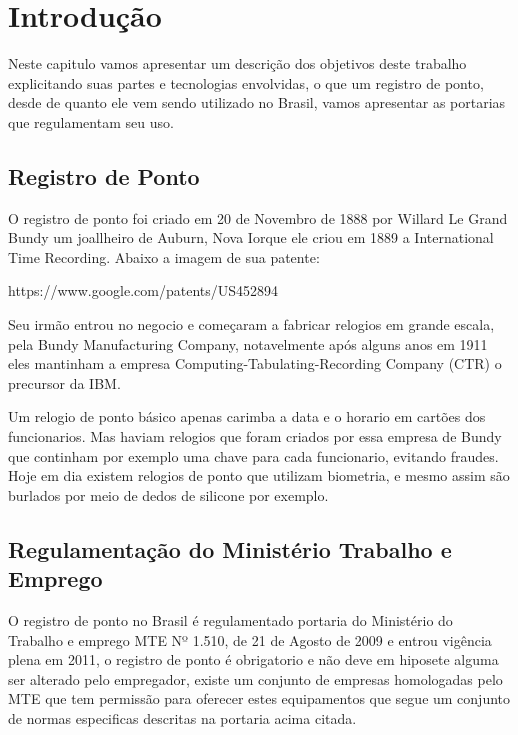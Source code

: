 \documentclass[12pt,openright,twoside,a4paper,english, brazil]{abntex2} %
\begin{document}
\listoffigures*
\cleardoublepage %
\listoftables* %
\cleardoublepage
\printterms[columns=1,style=align] %
\cleardoublepage %
\tableofcontents








\chapter{Introdução}



Neste capitulo vamos apresentar um descrição dos objetivos deste trabalho explicitando suas partes e tecnologias envolvidas, o que um registro de ponto, desde de quanto ele vem sendo utilizado no Brasil, vamos apresentar as portarias que regulamentam seu uso.

\section{Registro de Ponto}

O registro de ponto foi criado em 20 de Novembro de 1888 por Willard Le Grand Bundy um joallheiro de Auburn, Nova Iorque ele criou em 1889 a International Time Recording. Abaixo a imagem de sua patente:

https://www.google.com/patents/US452894

Seu irmão entrou no negocio e começaram a fabricar relogios em grande escala, pela Bundy Manufacturing Company, notavelmente após alguns anos em 1911 eles mantinham a empresa Computing-Tabulating-Recording Company (CTR) o precursor da IBM.

Um relogio de ponto básico apenas carimba a data e o horario em cartões dos funcionarios. Mas haviam relogios que foram criados por essa empresa de Bundy que continham por exemplo uma chave para cada funcionario, evitando fraudes. Hoje em dia existem relogios de ponto que utilizam biometria, e mesmo assim são burlados por meio de dedos de silicone por exemplo.

\section{Regulamentação do Ministério Trabalho e Emprego}

O registro de ponto no Brasil é regulamentado portaria do Ministério do Trabalho e emprego MTE Nº 1.510, de 21 de Agosto de 2009 e entrou vigência plena em 2011, o registro de ponto é obrigatorio e não deve em hiposete alguma ser alterado pelo empregador, existe um conjunto de empresas homologadas pelo MTE que tem permissão para oferecer estes equipamentos que segue um conjunto de normas especificas descritas na portaria acima citada.
\end{document}
